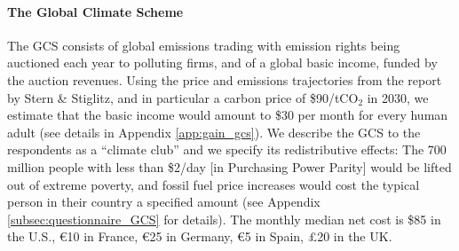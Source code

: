 \begin{tcolorbox}\label{box:GCS}
  \paragraph{The Global Climate Scheme} The GCS consists of global emissions trading with emission rights being auctioned each year to polluting firms, and of a global basic income, funded by the auction revenues. Using the price and emissions trajectories from the report by Stern \& Stiglitz,\cite{stern_report_2017} and in particular a carbon price of \$90/tCO$_\text{2}$ in 2030, we estimate that the basic income would amount to \$30 per month for every human adult %
  (see details in Appendix \ref{app:gain_gcs}). %
  We describe the GCS to the respondents as a ``climate club'' and we specify its redistributive effects: The 700 million people with less than \$2/day [in Purchasing Power Parity] would be lifted out of extreme poverty, and fossil fuel price increases would cost the typical person in their country a specified amount (see Appendix \ref{subsec:questionnaire_GCS} for details). The monthly median net cost is \$85 in the U.S., \euro{}10 in France, \euro{}25 in Germany, \euro{}5 in Spain, £20 in the UK.
\end{tcolorbox}

